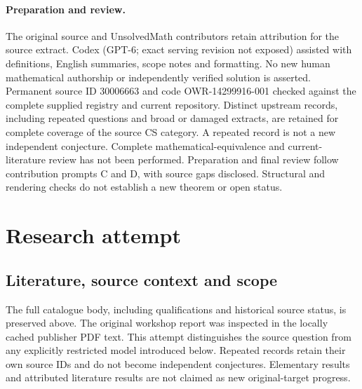\documentclass[11pt]{article}
\begin{document}
\paragraph{Preparation and review.}
The original source and UnsolvedMath contributors retain attribution for the source extract. Codex (GPT-6; exact serving revision not exposed) assisted with definitions, English summaries, scope notes and formatting. No new human mathematical authorship or independently verified solution is asserted. Permanent source ID 30006663 and code OWR-14299916-001 checked against the complete supplied registry and current repository. Distinct upstream records, including repeated questions and broad or damaged extracts, are retained for complete coverage of the source CS category. A repeated record is not a new independent conjecture. Complete mathematical-equivalence and current-literature review has not been performed. Preparation and final review follow contribution prompts C and D, with source gaps disclosed. Structural and rendering checks do not establish a new theorem or open status.
\label{end:30006663}

\section{Research attempt}
\subsection{Literature, source context and scope}
The full catalogue body, including qualifications and historical source status, is preserved above. The original workshop report was inspected in the locally cached publisher PDF text. This attempt distinguishes the source question from any explicitly restricted model introduced below. Repeated records retain their own source IDs and do not become independent conjectures. Elementary results and attributed literature results are not claimed as new original-target progress.
\end{document}
